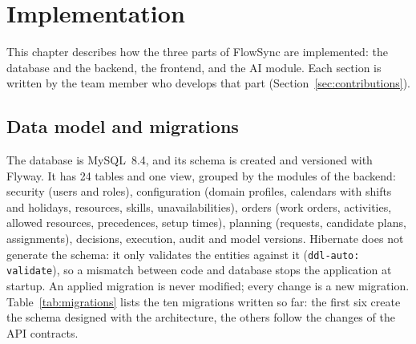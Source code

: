 \chapter{Implementation}
\label{chap:implementation}

This chapter describes how the three parts of FlowSync are implemented: the database and the
backend, the frontend, and the AI module. Each section is written by the team member who develops
that part (Section~\ref{sec:contributions}).


\section{Data model and migrations}
\label{sec:impl-db}

The database is MySQL~8.4, and its schema is created and versioned with Flyway. It has 24 tables
and one view, grouped by the modules of the backend: security (users and roles), configuration
(domain profiles, calendars with shifts and holidays, resources, skills, unavailabilities),
orders (work orders, activities, allowed resources, precedences, setup times), planning
(requests, candidate plans, assignments), decisions, execution, audit and model versions.
Hibernate does not generate the schema: it only validates the entities against it
(\texttt{ddl-auto: validate}), so a mismatch between code and database stops the application at
startup. An applied migration is never modified; every change is a new migration.
Table~\ref{tab:migrations} lists the ten migrations written so far: the first six create the
schema designed with the architecture, the others follow the changes of the API contracts.

